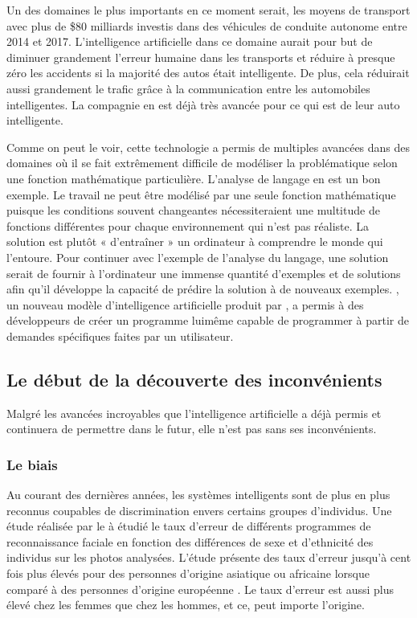 \documentclass[letterpaper,10pt,french]{sphinxmanual}
\begin{document}
Un des domaines le plus importants en ce moment serait, les moyens de transport avec plus de \$80
milliards investis dans des véhicules de conduite autonome entre 2014 et 2017. L’intelligence
artificielle dans ce domaine aurait pour but de diminuer grandement l’erreur humaine dans les transports
et réduire à presque zéro les accidents si la majorité des autos était intelligente. De plus, cela réduirait
aussi grandement le trafic grâce à la communication entre les automobiles intelligentes. La compagnie 
en est déjà très avancée pour ce qui est de leur auto intelligente. 

Comme on peut le voir, cette technologie a permis de multiples avancées dans des domaines où
il se fait extrêmement difficile de modéliser la problématique selon une
fonction mathématique particulière. L’analyse de langage en est un bon exemple.
Le travail ne peut être modélisé par une seule fonction mathématique puisque
les conditions souvent changeantes nécessiteraient une multitude de fonctions
différentes pour chaque environnement qui n’est pas réaliste. La solution est
plutôt « d’entraîner » un ordinateur à comprendre le monde qui l’entoure.
Pour continuer avec l’exemple de l’analyse du langage, une solution serait
de fournir à l’ordinateur une immense quantité d’exemples et de solutions afin
qu’il développe la capacité de prédire la solution à de nouveaux exemples.
,
un nouveau modèle d’intelligence artificielle produit par
, a permis à des développeurs de créer un programme
lui\sphinxhyphen{}même capable de programmer à partir de demandes spécifiques faites par un
utilisateur.


\subsection{Le début de la découverte des inconvénients}
\label{\detokenize{enonce_sujet:le-debut-de-la-decouverte-des-inconvenients}}
Malgré les avancées incroyables que l’intelligence artificielle a déjà permis et
continuera de permettre dans le futur, elle n’est pas sans ses inconvénients.


\subsubsection{Le biais}
\label{\detokenize{enonce_sujet:le-biais}}
Au
courant des dernières années, les systèmes intelligents sont de plus en plus
reconnus coupables de discrimination envers certains groupes d’individus. Une
étude réalisée par le  à étudié le taux d’erreur de
différents programmes de reconnaissance faciale en fonction des différences de
sexe et d’ethnicité des individus sur les photos analysées. L’étude
présente des taux d’erreur
jusqu’à cent fois plus élevés pour des personnes d’origine asiatique ou
africaine lorsque comparé à des personnes d’origine européenne .
Le taux d’erreur est aussi plus élevé chez les femmes que chez les hommes, et
ce, peut importe l’origine.
\end{document}
